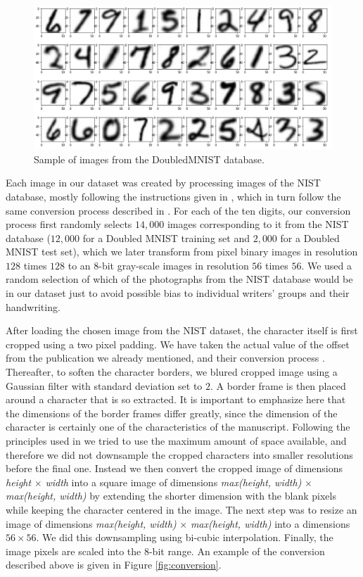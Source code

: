 \documentclass[eng]{simposium}
\begin{document}
\begin{figure}[!ht]
  \centering
  \includegraphics[width=1\textwidth]{sample_from_nist.png}
  \caption{Sample of images from the DoubledMNIST database.}
  \label{fig:nist_sample}
\end{figure}

Each image in our dataset was created by processing images of the NIST database, 
mostly following the instructions given in \cite{1}, which in turn follow the same conversion process described in \cite{8}. 
For each of the ten digits, our conversion process first randomly selects $14,000$ images corresponding to it from the NIST 
database ($12,000$ for a Doubled MNIST training set and $2,000$ for a Doubled MNIST test set), which we later transform 
from pixel binary images in resolution $128$ times $128$ to an 8-bit gray-scale images in resolution $56$ times $56$. 
We used a random selection of which of the photographs from the NIST database would be in our dataset just to avoid possible 
bias to individual writers' groups and their handwriting. 

After loading the chosen image from the NIST dataset, the character itself is first cropped using a two pixel padding. 
We have taken the actual value of the offset from the publication we already mentioned, and their conversion process \cite{1}. 
Thereafter, to soften the character borders, we blured cropped image using a Gaussian filter with standard deviation set to $2$. 
A border frame is then placed around a character that is so extracted. 
It is important to emphasize here that the dimensions of the border frames differ greatly, since the dimension of the 
character is certainly one of the characteristics of the manuscript. 
Following the principles used in \cite{1} we tried to use the maximum amount of space available, and 
therefore we did not downsample the cropped characters into smaller resolutions before the final one. 
Instead we then convert the cropped image of dimensions \textit{height} $\times$ \textit{width} into a square image of dimensions 
\textit{max(height, width)} $\times$ \textit{max(height, width)} by extending the shorter dimension with the blank pixels 
while keeping the character centered in the image. 
The next step was to resize an image of dimensions \textit{max(height, width)} $\times$ \textit{max(height, width)} into a 
dimensions $56 \times 56$.
We did this downsampling using bi-cubic interpolation. 
Finally, the image pixels are scaled into the 8-bit range. 
An example of the conversion described above is given in Figure \ref{fig:conversion}. 
\end{document}
